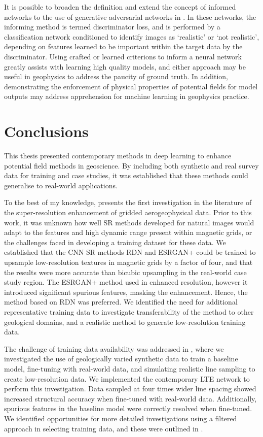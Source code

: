 It is possible to broaden the definition and extend the concept of informed networks to the use of generative adversarial networks in .
In these networks, the informing method is termed discriminator loss, and is performed by a classification network conditioned to identify images as `realistic' or `not realistic', depending on features learned to be important within the target data by the discriminator.
Using crafted or learned criterions to inform a neural network greatly assists with learning high quality models, and either approach may be useful in geophysics to address the paucity of ground truth.
In addition, demonstrating the enforcement of physical properties of potential fields for model outputs may address apprehension for machine learning in geophysics practice.

\printbibliography{}

\chapter{Conclusions}
\label{ch:conclusions}
This thesis presented contemporary methods in deep learning to enhance potential field methods in geoscience.
By including both synthetic and real survey data for training and case studies, it was established that these methods could generalise to real-world applications.

To the best of my knowledge,  presents the first investigation in the literature of the super-resolution enhancement of gridded aerogeophysical data.
Prior to this work, it was unknown how well SR methods developed for natural images would adapt to the features and high dynamic range present within magnetic grids, or the challenges faced in developing a training dataset for these data.
We established that the CNN SR methods RDN\textdaggerdbl{} and ESRGAN+ could be trained to upsample low-resolution textures in magnetic grids by a factor of four, and that the results were more accurate than bicubic upsampling in the real-world case study region.
The ESRGAN+ method used in  enhanced resolution, however it introduced significant spurious features, masking the enhancement.
Hence, the method based on RDN\textdaggerdbl{} was preferred. 
We identified the need for additional representative training data to investigate transferability of the method to other geological domains, and a realistic method to generate low-resolution training data.

The challenge of training data availability was addressed in , where we investigated the use of geologically varied synthetic data to train a baseline model, fine-tuning with real-world data, and simulating realistic line sampling to create low-resolution data.
We implemented the contemporary LTE network to perform this investigation.
Data sampled at four times wider line spacing showed increased structural accuracy when fine-tuned with real-world data.
Additionally, spurious features in the baseline model were correctly resolved when fine-tuned.
We identified opportunities for more detailed investigations using a filtered approach in selecting training data, and these were outlined in .

